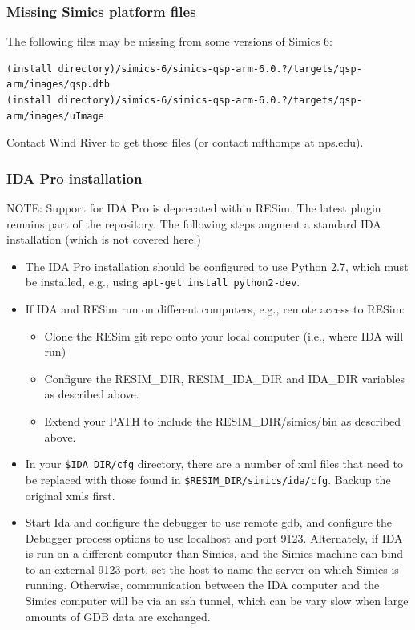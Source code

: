 \documentclass[titlepage]{article}
\begin{document}
\subsubsection{Missing Simics platform files}
The following files may be missing from some versions of Simics 6:
\begin{verbatim}
(install directory)/simics-6/simics-qsp-arm-6.0.?/targets/qsp-arm/images/qsp.dtb
(install directory)/simics-6/simics-qsp-arm-6.0.?/targets/qsp-arm/images/uImage
\end{verbatim}
Contact Wind River to get those files (or contact mfthomps at nps.edu).

\subsubsection{IDA Pro installation}
\label{ida-install}
NOTE: Support for IDA Pro is deprecated within RESim.  The latest plugin remains part of the repository.
The following steps augment a standard IDA installation (which is not covered here.)
\begin{itemize}
\item The IDA Pro installation should be configured to use Python 2.7, which must be
installed, e.g., using {\tt apt-get install python2-dev}. 
\item If IDA and RESim run on different computers, e.g., remote access to RESim: 
\begin{itemize}
\item Clone the RESim git repo onto your local computer (i.e., where IDA will run)
\item Configure the RESIM\_DIR, RESIM\_IDA\_DIR and
IDA\_DIR variables as described above.  
\item Extend your PATH to include the RESIM\_DIR/simics/bin as described above.
\end{itemize}

\item In your {\tt \$IDA\_DIR/cfg} directory, there are a number of xml files that need to be replaced with those found
in {\tt \$RESIM\_DIR/simics/ida/cfg}.  Backup the original xmls first.

\item Start Ida and configure the debugger to use remote gdb, and configure the Debugger process options to use localhost and port 9123.  Alternately,
if IDA is run on a different computer than Simics, and the Simics machine can bind to an external 9123 port, set the host to name the server
on which Simics is running.  Otherwise, communication between the IDA computer and the Simics computer will be via an ssh tunnel, which can be vary slow
when large amounts of GDB data are exchanged.

\end{itemize}
\end{document}
